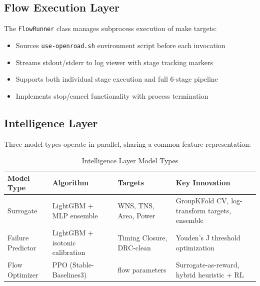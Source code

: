 \documentclass[10pt,conference]{IEEEtran}
\newcommand{\ORFS}{\text{ORFS}}
\begin{document}
\subsection{Flow Execution Layer}

The \texttt{FlowRunner} class manages subprocess execution of \ORFS{} make targets:
\begin{itemize}
    \item Sources \texttt{use-openroad.sh} environment script before each invocation
    \item Streams stdout/stderr to log viewer with stage tracking markers
    \item Supports both individual stage execution and full 6-stage pipeline
    \item Implements stop/cancel functionality with process termination
\end{itemize}

\subsection{Intelligence Layer}

Three model types operate in parallel, sharing a common feature representation:

\begin{table}[t]
\centering
\caption{Intelligence Layer Model Types}
\label{tab:model_types}
\small
\setlength{\tabcolsep}{2.5pt}
\renewcommand{\arraystretch}{1.12}
\begin{tabularx}{\columnwidth}{@{}>{\raggedright\arraybackslash}p{}>{\raggedright\arraybackslash}p{}>{\raggedright\arraybackslash}p{}X@{}}
\toprule
Model Type & Algorithm & Targets & Key Innovation \\
\midrule
Surrogate & LightGBM + MLP ensemble & WNS, TNS, Area, Power & GroupKFold CV, log-transform targets, ensemble \\
Failure Predictor & LightGBM + isotonic calibration & Timing Closure, DRC-clean & Youden's J threshold optimization \\
Flow Optimizer & PPO (Stable-Baselines3) & 16 flow parameters & Surrogate-as-reward, hybrid heuristic + RL \\
\bottomrule
\end{tabularx}
\end{table}

\end{document}
